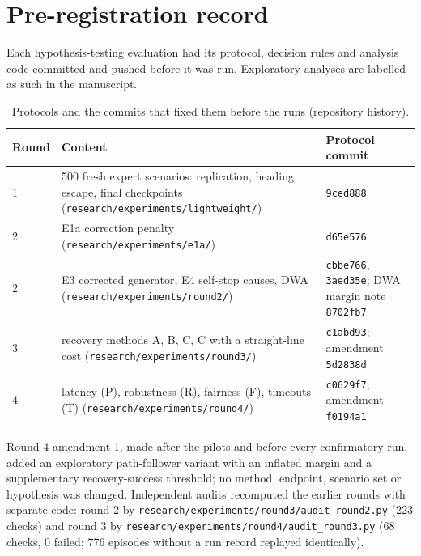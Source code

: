 \documentclass[11pt]{article}
\begin{document}
\section{Pre-registration record}
Each hypothesis-testing evaluation had its protocol, decision rules and analysis code committed and pushed before it was run. Exploratory analyses are labelled as such in the manuscript.

\begin{table}[htbp]
\centering\small
\caption{Protocols and the commits that fixed them before the runs (repository history).}
\begin{tabularx}{\linewidth}{@{}lXl@{}}
\toprule
Round & Content & Protocol commit \\
\midrule
1 & 500 fresh expert scenarios: replication, heading escape, final checkpoints (\texttt{research/experiments/lightweight/}) & \texttt{9ced888} \\
2 & E1a correction penalty (\texttt{research/experiments/e1a/}) & \texttt{d65e576} \\
2 & E3 corrected generator, E4 self-stop causes, DWA (\texttt{research/experiments/round2/}) & \texttt{cbbe766}, \texttt{3aed35e}; DWA margin note \texttt{8702fb7} \\
3 & recovery methods A, B, C, C with a straight-line cost (\texttt{research/experiments/round3/}) & \texttt{c1abd93}; amendment \texttt{5d2838d} \\
4 & latency (P), robustness (R), fairness (F), timeouts (T) (\texttt{research/experiments/round4/}) & \texttt{c0629f7}; amendment \texttt{f0194a1} \\
\bottomrule
\end{tabularx}
\end{table}

\noindent Round-4 amendment 1, made after the pilots and before every confirmatory run, added an exploratory path-follower variant with an inflated margin and a supplementary recovery-success threshold; no method, endpoint, scenario set or hypothesis was changed. Independent audits recomputed the earlier rounds with separate code: round 2 by \texttt{research/experiments/round3/audit\_round2.py} (223 checks) and round 3 by \texttt{research/experiments/round4/audit\_round3.py} (68 checks, 0 failed; 776 episodes without a run record replayed identically).

\end{document}
